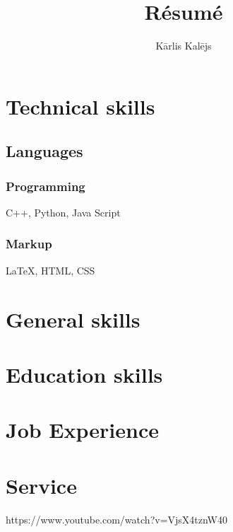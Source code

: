 \documentclass{article}
\begin{document}
\title{R\'esum\'e}
\author{K\={a}rlis Kal\={e}js}
\maketitle

\section{Technical skills}

\subsection{Languages}

\subsubsection{Programming}

C++, Python, Java Script

\subsubsection{Markup}

{\LaTeX}, HTML, CSS

\section{General skills}

\section{Education skills}

\section{Job Experience}

\section{Service}

https://www.youtube.com/watch?v=VjsX4tznW40
\end{document}
